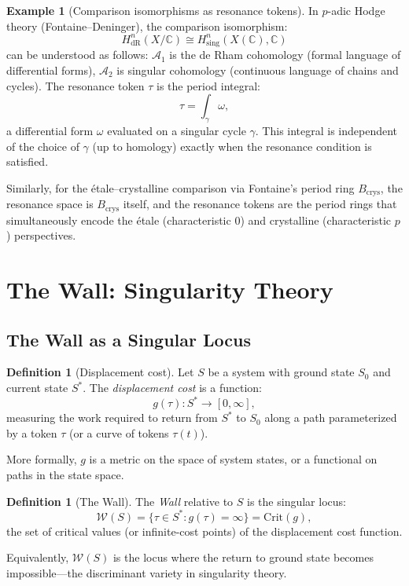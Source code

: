 \documentclass[12pt]{article}
\theoremstyle{definition}
\newtheorem{definition}[theorem]{Definition}
\newtheorem{example}[theorem]{Example}
\theoremstyle{remark}
\begin{document}
\begin{example}[Comparison isomorphisms as resonance tokens]
In $p$-adic Hodge theory (Fontaine--Deninger), the comparison isomorphism:
\[
H^n_{\mathrm{dR}}(X/\mathbb{C}) \cong H^n_{\mathrm{sing}}(X(\mathbb{C}), \mathbb{C})
\]
can be understood as follows: $\mathcal{A}_1$ is the de Rham cohomology (formal language of differential forms), $\mathcal{A}_2$ is singular cohomology (continuous language of chains and cycles). The resonance token $\tau$ is the period integral:
\[
\tau = \int_\gamma \omega,
\]
a differential form $\omega$ evaluated on a singular cycle $\gamma$. This integral is independent of the choice of $\gamma$ (up to homology) exactly when the resonance condition is satisfied.

Similarly, for the \'etale--crystalline comparison via Fontaine's period ring $B_{\mathrm{crys}}$, the resonance space is $B_{\mathrm{crys}}$ itself, and the resonance tokens are the period rings that simultaneously encode the \'etale (characteristic 0) and crystalline (characteristic $p$) perspectives.
\end{example}

\section{The Wall: Singularity Theory}

\subsection{The Wall as a Singular Locus}

\begin{definition}[Displacement cost]
Let $S$ be a system with ground state $S_0$ and current state $S^*$. The \emph{displacement cost} is a function:
\[
g(\tau) : S^* \to [0, \infty],
\]
measuring the work required to return from $S^*$ to $S_0$ along a path parameterized by a token $\tau$ (or a curve of tokens $\tau(t)$).

More formally, $g$ is a metric on the space of system states, or a functional on paths in the state space.
\end{definition}

\begin{definition}[The Wall]
The \emph{Wall} relative to $S$ is the singular locus:
\[
\mathcal{W}(S) = \{\tau \in S^* : g(\tau) = \infty\} = \text{Crit}(g),
\]
the set of critical values (or infinite-cost points) of the displacement cost function.

Equivalently, $\mathcal{W}(S)$ is the locus where the return to ground state becomes impossible---the discriminant variety in singularity theory.
\end{definition}
\end{document}
